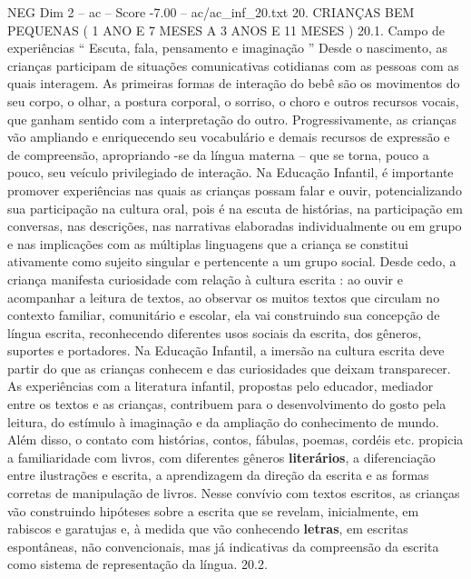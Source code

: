 \begin{textsample}{NEG Dim 2 – ac – Score -7.00 – ac/ac\_inf\_20.txt}  \label{ex:f2_neg_122}
20.
CRIANÇAS BEM PEQUENAS ( 1 ANO E 7 MESES A 3 ANOS E 11 MESES ) 20.1.
Campo de experiências “ Escuta, fala, pensamento e imaginação ” Desde o nascimento, as crianças participam de situações comunicativas cotidianas com as pessoas com as quais interagem.
As primeiras formas de interação do bebê são os movimentos do seu corpo, o olhar, a postura corporal, o sorriso, o choro e outros recursos vocais, que ganham sentido com a interpretação do outro.
Progressivamente, as crianças vão ampliando e enriquecendo seu vocabulário e demais recursos de expressão e de compreensão, apropriando -se da língua materna – que se torna, pouco a pouco, seu veículo privilegiado de interação.
Na Educação Infantil, é importante promover experiências nas quais as crianças possam falar e ouvir, potencializando sua participação na cultura oral, pois é na escuta de histórias, na participação em conversas, nas descrições, nas narrativas elaboradas individualmente ou em grupo e nas implicações com as múltiplas linguagens que a criança se constitui ativamente como sujeito singular e pertencente a um grupo social.
Desde cedo, a criança manifesta curiosidade com relação à cultura escrita : ao ouvir e acompanhar a leitura de textos, ao observar os muitos textos que circulam no contexto familiar, comunitário e escolar, ela vai construindo sua concepção de língua escrita, reconhecendo diferentes usos sociais da escrita, dos gêneros, suportes e portadores.
Na Educação Infantil, a imersão na cultura escrita deve partir do que as crianças conhecem e das curiosidades que deixam transparecer.
As experiências com a literatura infantil, propostas pelo educador, mediador entre os textos e as crianças, contribuem para o desenvolvimento do gosto pela leitura, do estímulo à imaginação e da ampliação do conhecimento de mundo.
Além disso, o contato com histórias, contos, fábulas, poemas, cordéis etc. propicia a familiaridade com livros, com diferentes gêneros \textbf{literários}, a diferenciação entre ilustrações e escrita, a aprendizagem da direção da escrita e as formas corretas de manipulação de livros.
Nesse convívio com textos escritos, as crianças vão construindo hipóteses sobre a escrita que se revelam, inicialmente, em rabiscos e garatujas e, à medida que vão conhecendo \textbf{letras}, em escritas espontâneas, não convencionais, mas já indicativas da compreensão da escrita como sistema de representação da língua. 20.2.

\end{textsample}

